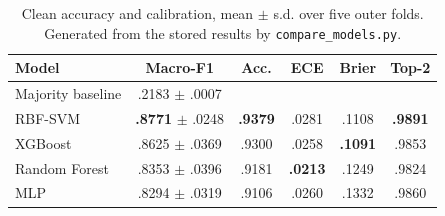 \begin{table}[t]
\centering
\caption{Clean accuracy and calibration, mean $\pm$ s.d. over five outer folds. Generated from the stored results by \texttt{compare\_models.py}.}
\label{tab:main}
\footnotesize
\setlength{\tabcolsep}{4pt}
\begin{tabular}{lccccc}
\toprule
Model & Macro-F1 & Acc. & ECE & Brier & Top-2 \\
\midrule
Majority baseline & .2183 $\pm$ .0007 &  &  &  &  \\
RBF-SVM & \textbf{.8771} $\pm$ .0248 & \textbf{.9379} & .0281 & .1108 & \textbf{.9891} \\
XGBoost & .8625 $\pm$ .0369 & .9300 & .0258 & \textbf{.1091} & .9853 \\
Random Forest & .8353 $\pm$ .0396 & .9181 & \textbf{.0213} & .1249 & .9824 \\
MLP & .8294 $\pm$ .0319 & .9106 & .0260 & .1332 & .9860 \\
\bottomrule
\end{tabular}
\end{table}
